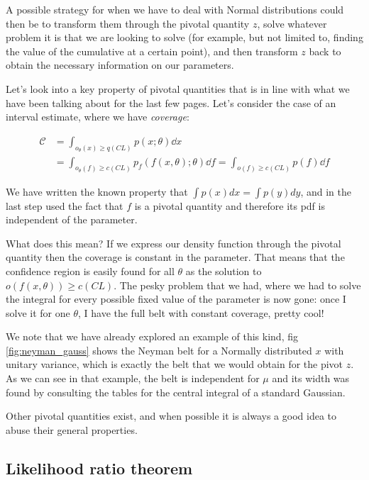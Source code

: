 A possible strategy for when we have to deal with Normal distributions could then be to transform them through the pivotal quantity $z$, solve whatever problem it is that we are looking to solve (for example, but not limited to, finding the value of the cumulative at a certain point), and then transform $z$ back to obtain the necessary information on our parameters. 

Let's look into a key property of pivotal quantities that is in line with what we have been talking about for the last few pages. Let's consider the case of an interval estimate, where we have \emph{coverage}:
	
\begin{align*}
	\mathcal{C} &= \int_{o_{\theta}(x)\geq q(CL)} p(x;\theta)\dd x \\
	&= \int_{o_{\theta}(f)\geq c(CL)} p_f\left(f(x,\theta);\theta\right)\dd f = \int_{o(f)\geq c(CL)} p(f) \dd f
\end{align*}

We have written the known property that $\int p(x) dx = \int p(y) dy$, and in the last step used the fact that $f$ is a pivotal quantity and therefore its pdf is independent of the parameter.

What does this mean? If we express our density function through the pivotal quantity then the coverage is constant in the parameter. That means that the confidence region is easily found for all $\theta$ as the solution to $o(f(x,\theta))\geq c(CL)$. The pesky problem that we had, where we had to solve the integral for every possible fixed value of the parameter is now gone: once I solve it for one $\theta$, I have the full belt with constant coverage, pretty cool! 

We note that we have already explored an example of this kind, fig \ref{fig:neyman_gauss} shows the Neyman belt for a Normally distributed $x$ with unitary variance, which is exactly the belt that we would obtain for the pivot $z$. As we can see in that example, the belt is independent for $\mu$ and its width was found by consulting the tables for the central integral of a standard Gaussian.

Other pivotal quantities exist, and when possible it is always a good idea to abuse their general properties.


\subsection{Likelihood ratio theorem}

